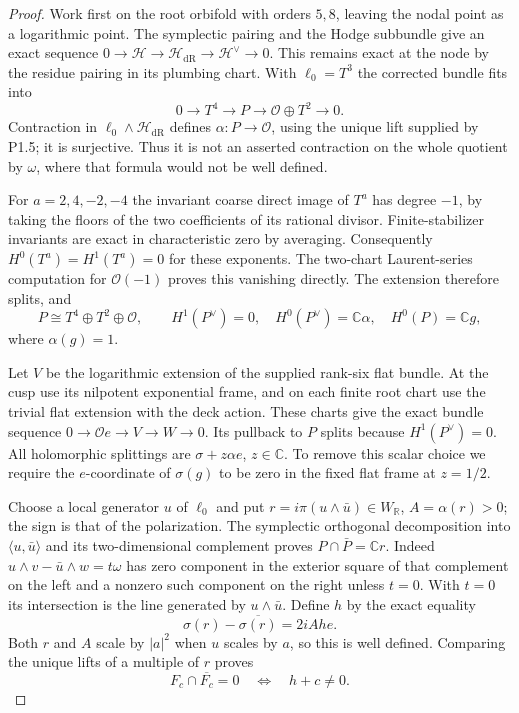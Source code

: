 \begin{proof}
Work first on the root orbifold with orders $5,8$, leaving the nodal
point as a logarithmic point.  The symplectic pairing and the Hodge
subbundle give an exact sequence
$0\to\mathcal H\to\mathcal H_{\mathrm{dR}}\to\mathcal H^\vee\to0$.
This remains exact at the node by the residue pairing in its plumbing
chart.  With $\ell_0=T^3$ the corrected bundle fits into
\[
0\longrightarrow T^4\longrightarrow P
 \longrightarrow\mathcal O\oplus T^2\longrightarrow0.
\]
Contraction in $\ell_0\wedge\mathcal H_{\mathrm{dR}}$ defines
$\alpha:P\to\mathcal O$, using the unique lift supplied by P1.5;
it is surjective.  Thus it is not an asserted contraction on the whole
quotient by $\omega$, where that formula would not be well defined.

For $a=2,4,-2,-4$ the invariant coarse direct image of $T^a$ has degree
$-1$, by taking the floors of the two coefficients of its rational
divisor.  Finite-stabilizer invariants are exact in characteristic zero
by averaging.  Consequently $H^0(T^a)=H^1(T^a)=0$ for these exponents.
The two-chart Laurent-series computation for $\mathcal O(-1)$ proves
this vanishing directly.  The extension therefore splits, and
\[
P\cong T^4\oplus T^2\oplus\mathcal O,\qquad
H^1(P^\vee)=0,\quad H^0(P^\vee)=\mathbb C\alpha,
\quad H^0(P)=\mathbb Cg,
\]
where $\alpha(g)=1$.

Let $V$ be the logarithmic extension of the supplied rank-six flat
bundle.  At the cusp use its nilpotent exponential frame, and on each
finite root chart use the trivial flat extension with the deck action.
These charts give the exact bundle sequence
$0\to\mathcal Oe\to V\to W\to0$.
Its pullback to $P$ splits because $H^1(P^\vee)=0$.
All holomorphic splittings are $\sigma+z\alpha e$, $z\in\mathbb C$.
To remove this scalar choice we require the $e$-coordinate of
$\sigma(g)$ to be zero in the fixed flat frame at $z=1/2$.

Choose a local generator $u$ of $\ell_0$ and put
$r=i\pi(u\wedge\bar u)\in W_{\mathbb R}$, $A=\alpha(r)>0$;
the sign is that of the polarization.  The symplectic orthogonal
decomposition into $\langle u,\bar u\rangle$ and its two-dimensional
complement proves $P\cap\bar P=\mathbb Cr$.
Indeed $u\wedge v-\bar u\wedge w=t\omega$ has zero component in the
exterior square of that complement on the left and a nonzero such
component on the right unless $t=0$.  With $t=0$ its intersection is
the line generated by $u\wedge\bar u$.
Define $h$ by the exact equality
\[
\sigma(r)-\overline{\sigma(r)}=2iAh e.
\]
Both $r$ and $A$ scale by $|a|^2$ when $u$ scales by $a$, so this is
well defined.  Comparing the unique lifts of a multiple of $r$ proves
\[
F_c\cap\overline{F_c}=0\quad\Longleftrightarrow\quad h+c\ne0.
\]


\end{proof}
